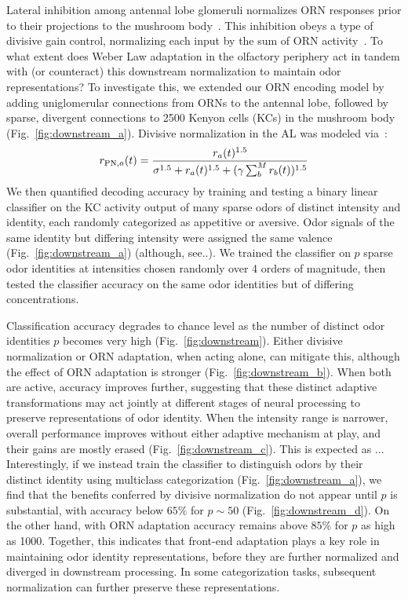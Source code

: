 Lateral inhibition among antennal lobe glomeruli normalizes ORN responses prior to their projections to the mushroom body~\cite{lateral_inh, lateral_inh_asahina}. This inhibition obeys a type of divisive gain control, normalizing each input by the sum of ORN activity~\cite{divisive_normalization}. To what extent does Weber Law adaptation in the olfactory periphery act in tandem with (or counteract) this downstream normalization to maintain odor representations? To investigate this, we extended our ORN encoding model by adding uniglomerular connections from ORNs to the antennal lobe, followed by sparse, divergent connections to 2500 Kenyon cells (KCs) in the mushroom body~\cite{memory_review, litwinkumar, abbott_axel} (Fig.~\ref{fig:downstream_a}). Divisive normalization in the AL was modeled via~\cite{divisive_normalization}:
\begin{align}
r_{\textup{PN}, a}(t) = \frac{r_a(t)^{1.5}}{\sigma^{1.5} + r_a(t)^{1.5} + (\gamma\sum_b^Mr_b(t))^{1.5}}
\end{align}
We then quantified decoding accuracy by training and testing a binary linear classifier on the KC activity output of  many sparse odors of distinct intensity and identity,  each randomly categorized as appetitive or aversive. Odor signals of the same identity but differing intensity were assigned the same valence (Fig.~\ref{fig:downstream_a}) (although, see..).  We trained the classifier on $p$ sparse odor identities at intensities chosen randomly over 4 orders of magnitude, then tested the classifier accuracy on the same odor identities but of differing concentrations. 

Classification accuracy degrades to chance level as the number of distinct odor identities $p$ becomes very high (Fig.~\ref{fig:downstream}). Either divisive normalization or ORN adaptation, when acting alone, can mitigate this, although the effect of ORN adaptation is stronger (Fig.~\ref{fig:downstream_b}). When both are active, accuracy improves further, suggesting that these distinct adaptive transformations may act jointly at different stages of neural processing to preserve representations of odor identity.  When the intensity range is narrower, overall performance improves without either adaptive mechanism at play, and their gains are mostly erased  (Fig.~\ref{fig:downstream_c}). This is expected as ... Interestingly, if we instead train the classifier to distinguish odors by their distinct identity using multiclass categorization (Fig.~\ref{fig:downstream_a}), we find that the benefits conferred by divisive normalization do not appear until $p$ is substantial, with accuracy below $65\%$ for $p \sim 50$ (Fig.~\ref{fig:downstream_d}). On the other hand, with ORN adaptation accuracy remains above $85\%$ for $p$ as high as 1000. Together, this indicates that front-end adaptation plays a key role in maintaining odor identity representations, before they are further normalized and diverged in downstream processing. In some categorization tasks, subsequent normalization can further preserve these representations.

